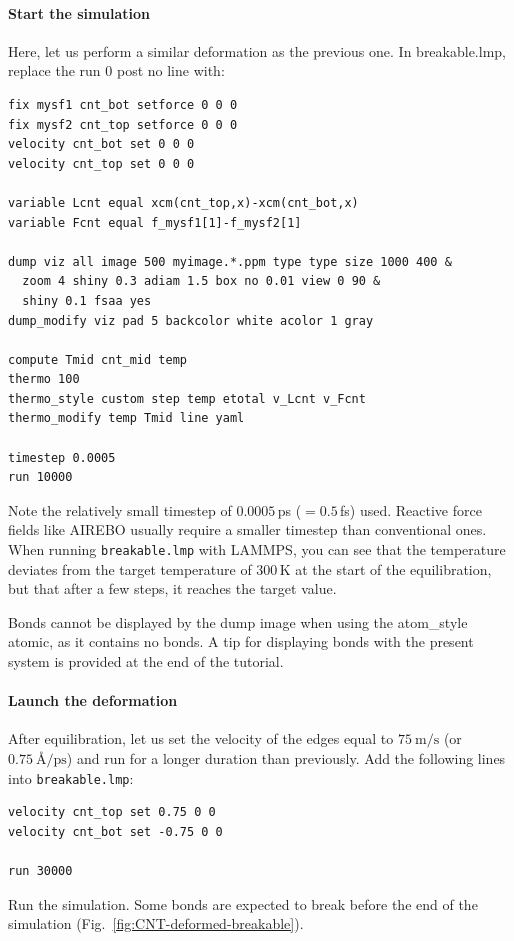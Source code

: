 \documentclass[9pt,tutorial]{livecoms}
\newcommand{\lmpcmd}[1]{\hspace{0pt}\colorbox{listing}{\textcolor{command}{\small{#1}}}\hspace{0pt}} %
\newcommand{\lmpcmdnote}[1]{\hspace{0pt}\colorbox{note_listing}{\textcolor{command}{\small{#1}}}\hspace{0pt}} %
\newcommand{\flecmd}[1]{\textcolor{command}{\texttt{#1}}} %
\begin{document}
\paragraph{Start the simulation}

Here, let us perform a similar deformation as the previous one.
In \lmpcmd{breakable.lmp}, replace the \lmpcmd{run 0 post no} line with:
\begin{lstlisting}
fix mysf1 cnt_bot setforce 0 0 0
fix mysf2 cnt_top setforce 0 0 0
velocity cnt_bot set 0 0 0
velocity cnt_top set 0 0 0

variable Lcnt equal xcm(cnt_top,x)-xcm(cnt_bot,x)
variable Fcnt equal f_mysf1[1]-f_mysf2[1]

dump viz all image 500 myimage.*.ppm type type size 1000 400 &
  zoom 4 shiny 0.3 adiam 1.5 box no 0.01 view 0 90 &
  shiny 0.1 fsaa yes
dump_modify viz pad 5 backcolor white acolor 1 gray

compute Tmid cnt_mid temp
thermo 100
thermo_style custom step temp etotal v_Lcnt v_Fcnt
thermo_modify temp Tmid line yaml

timestep 0.0005
run 10000
\end{lstlisting}
Note the relatively small timestep of $0.0005$\,ps ($= 0.5$\,fs) used.  Reactive force
fields like AIREBO usually require a smaller timestep than conventional ones.  When running
\flecmd{breakable.lmp} with LAMMPS, you can see that the temperature deviates
from the target temperature of $300\,\text{K}$ at the start of the equilibration,
but that after a few steps, it reaches the target value.

\begin{note}
  Bonds cannot be displayed by the \lmpcmdnote{dump image} when using
  the \lmpcmdnote{atom\_style atomic}, as it contains no bonds.
  A tip for displaying bonds with the present system is provided at
  the end of the tutorial.
\end{note}

\paragraph{Launch the deformation}

After equilibration, let us set the velocity of the edges equal to
$75~\text{m/s}$ (or $0.75~\text{\AA{}/ps}$) and run for a longer duration than
previously. Add the following lines into \flecmd{breakable.lmp}:
\begin{lstlisting}
velocity cnt_top set 0.75 0 0
velocity cnt_bot set -0.75 0 0

run 30000
\end{lstlisting}
Run the simulation.  Some bonds are expected to break before the end of the
simulation (Fig.~\ref{fig:CNT-deformed-breakable}).
\end{document}

